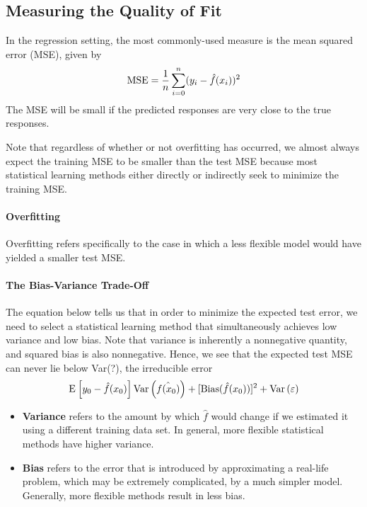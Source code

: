 \subsection{Measuring the Quality of Fit}
In the regression setting, the most commonly-used measure is the mean squared error (MSE), given by
\[ \mathrm{MSE} = \frac{1}{n} \sum_{i=0}^n (y_i - \hat{f}(x_i))^2  \]
The MSE will be small if the predicted responses are very close to the true responses.

Note that regardless of whether or not overfitting has
occurred, we almost always expect the training MSE to be smaller than
the test MSE because most statistical learning methods either directly or
indirectly seek to minimize the training MSE.

\paragraph{Overfitting}
Overfitting refers specifically
to the case in which a less flexible model would have yielded a smaller
test MSE.

\paragraph{The Bias-Variance Trade-Off}
The equation below tells us that in order to minimize the expected test error,
we need to select a statistical learning method that simultaneously achieves
low variance and low bias. Note that variance is inherently a nonnegative
quantity, and squared bias is also nonnegative. Hence, we see that the
expected test MSE can never lie below Var(?), the irreducible error
\[ \mathrm{E}_{} \left[ y_0 - \hat{f}(x_0) \right] \mathrm{Var} \left( \hat{f(x_0)} \right) + [ \mathrm{Bias}(\hat{f}(x_0))]^2 + \mathrm{Var} \left( \varepsilon \right) \]
\begin{itemize}
    \item \textbf{Variance} refers to the amount by which $\hat{f}$ would change if we estimated it using a different training data set.  In general, more flexible statistical methods have higher variance.
    \item \textbf{Bias} refers to the error that is introduced by approximating a real-life problem, which may be extremely complicated, by a much simpler model. Generally, more flexible methods result in less bias.
\end{itemize}

